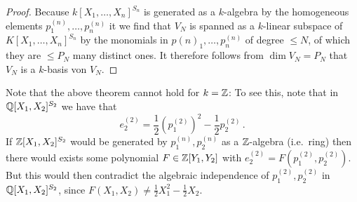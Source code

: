 \begin{proof}
  Because $k[X_1, \dotsc, X_n]^{S_n}$ is generated as a $k$-algebra by the homogeneous elements $p^{(n)}_1, \dotsc, p^{(n)}_n$ it we find that $V_N$ is spanned as a $k$-linear subspace of $K[X_1, \dotsc, X_n]^{S_n}$ by the monomials in $p{(n)}_1, \dotsc, p^{(n)}_n$ of degree $\leq N$, of which they are $\leq P_N$ many distinct ones.
  It therefore follows from $\dim V_N = P_N$ that $V_N$ is a $k$-basis von $V_N$.
\end{proof}


\begin{remark}
  Note that the above theorem cannot hold for $k = \mathbb{Z}$:
  To see this, note that in $\mathbb{Q}[X_1, X_2]^{S_2}$ we have that
  \[
      e^{(2)}_2
    = \frac{1}{2} \left( p^{(2)}_1 \right)^2 - \frac{1}{2} p^{(2)}_2 \,.
  \]
  If $\mathbb{Z}[X_1, X_2]^{S_2}$ would be generated by $p^{(n)}_1, p^{(n)}_2$ as a $\mathbb{Z}$-algebra (i.e.\ ring) then there would exists some polynomial $F \in \mathbb{Z}[Y_1, Y_2]$ with $e^{(2)}_2 = F( p^{(2)}_1, p^{(2)}_2)$.
  But this would then contradict the algebraic independence of $p^{(2)}_1, p^{(2)}_2$ in $\mathbb{Q}[X_1, X_2]^{S_2}$, since $F(X_1, X_2) \neq \frac{1}{2} X_1^2 - \frac{1}{2} X_2$.
\end{remark}


% 


